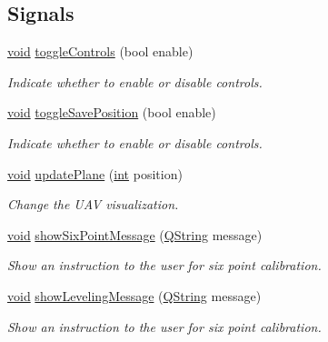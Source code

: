 \subsection*{Signals}
\begin{DoxyCompactItemize}
\item 
\hyperlink{group___u_a_v_objects_plugin_ga444cf2ff3f0ecbe028adce838d373f5c}{void} \hyperlink{class_calibration_acd2d18249304f970ea2b88be25ffacf4}{toggle\-Controls} (bool enable)
\begin{DoxyCompactList}\small\item\em Indicate whether to enable or disable controls. \end{DoxyCompactList}\item 
\hyperlink{group___u_a_v_objects_plugin_ga444cf2ff3f0ecbe028adce838d373f5c}{void} \hyperlink{class_calibration_a5c0c4477675b95dc0417496eb667f187}{toggle\-Save\-Position} (bool enable)
\begin{DoxyCompactList}\small\item\em Indicate whether to enable or disable controls. \end{DoxyCompactList}\item 
\hyperlink{group___u_a_v_objects_plugin_ga444cf2ff3f0ecbe028adce838d373f5c}{void} \hyperlink{class_calibration_abf64232b5acd7d93c98cf1394b0547d8}{update\-Plane} (\hyperlink{ioapi_8h_a787fa3cf048117ba7123753c1e74fcd6}{int} position)
\begin{DoxyCompactList}\small\item\em Change the U\-A\-V visualization. \end{DoxyCompactList}\item 
\hyperlink{group___u_a_v_objects_plugin_ga444cf2ff3f0ecbe028adce838d373f5c}{void} \hyperlink{class_calibration_a3cd34992a8bea67dbc42f5a4dbe1d08d}{show\-Six\-Point\-Message} (\hyperlink{group___u_a_v_objects_plugin_gab9d252f49c333c94a72f97ce3105a32d}{Q\-String} message)
\begin{DoxyCompactList}\small\item\em Show an instruction to the user for six point calibration. \end{DoxyCompactList}\item 
\hyperlink{group___u_a_v_objects_plugin_ga444cf2ff3f0ecbe028adce838d373f5c}{void} \hyperlink{class_calibration_a398c9601c7103ec24323e32474d20757}{show\-Leveling\-Message} (\hyperlink{group___u_a_v_objects_plugin_gab9d252f49c333c94a72f97ce3105a32d}{Q\-String} message)
\begin{DoxyCompactList}\small\item\em Show an instruction to the user for six point calibration. \end{DoxyCompactList}\item 

\end{DoxyCompactItemize}

